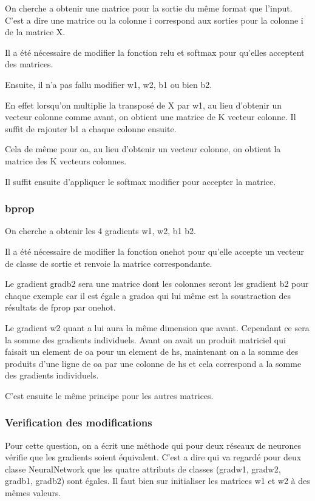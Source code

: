 \documentclass[a4paper,11pt]{article}
\begin{document}
On cherche a obtenir une matrice pour la sortie du même format que l'input. C'est a dire une matrice ou la colonne i correspond aux sorties pour la colonne i de la matrice X.

Il a été nécessaire de modifier la fonction relu et softmax pour qu'elles acceptent des matrices.

Ensuite, il n'a pas fallu modifier w1, w2, b1 ou bien b2.

En effet lorsqu'on multiplie la transposé de X par w1, au lieu d'obtenir un vecteur colonne comme avant, on obtient une matrice de K vecteur colonne. Il suffit de rajouter b1 a chaque colonne ensuite.

Cela de même pour oa, au lieu d'obtenir un vecteur colonne, on obtient la matrice des K vecteurs colonnes.


Il suffit ensuite d'appliquer le softmax modifier pour accepter la matrice.
\subsubsection{bprop}

On cherche a obtenir les 4 gradients  w1, w2, b1 b2.

Il a été nécessaire de modifier la fonction onehot pour qu'elle accepte un vecteur de classe de sortie et renvoie la matrice correspondante.

Le gradient gradb2 sera une matrice dont les colonnes seront les gradient b2 pour chaque exemple car il est égale a gradoa qui lui même est la soustraction des résultats de fprop par onehot.

Le gradient w2 quant a lui aura la même dimension que avant. Cependant ce sera la somme des gradients individuels. Avant on avait un produit matriciel qui faisait un element de oa pour un element de hs, maintenant on a la somme des produits d'une ligne de oa par une colonne de hs et cela correspond a la somme des gradients individuels.

C'est ensuite le même principe pour les autres matrices.

\subsubsection{Verification des modifications}
Pour cette question, on a écrit une méthode qui pour deux réseaux de neurones vérifie que les gradients soient équivalent. C'est a dire qui va regardé pour deux classe NeuralNetwork que les quatre attributs de classes (gradw1, gradw2, gradb1, gradb2) sont égales. Il faut bien sur initialiser les matrices w1 et w2 à des mêmes valeurs.
\end{document}
